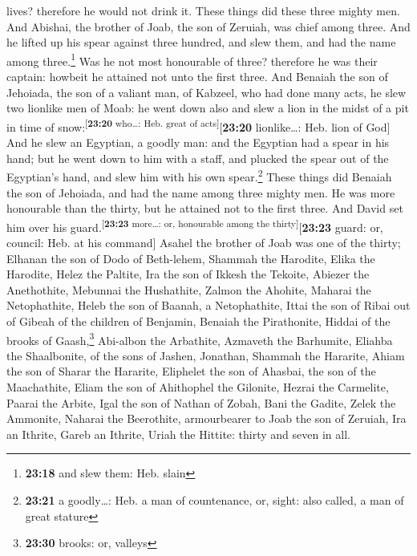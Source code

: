 lives? therefore he would not drink it. These things did these three
mighty men.  And Abishai, the brother of Joab, the son of
Zeruiah, was chief among three. And he lifted up his spear against three
hundred, and slew them, and had the name among three.\footnote{\textbf{23:18}
  and slew them: Heb. slain}  Was he not most honourable
of three? therefore he was their captain: howbeit he attained not unto
the first three.  And Benaiah the son of Jehoiada, the
son of a valiant man, of Kabzeel, who had done many acts, he slew two
lionlike men of Moab: he went down also and slew a lion in the midst of
a pit in time of snow:\textsuperscript{{[}\textbf{23:20} who\ldots: Heb.
great of acts{]}}{[}\textbf{23:20} lionlike\ldots: Heb. lion of God{]}
 And he slew an Egyptian, a goodly man: and the Egyptian
had a spear in his hand; but he went down to him with a staff, and
plucked the spear out of the Egyptian's hand, and slew him with his own
spear.\footnote{\textbf{23:21} a goodly\ldots: Heb. a man of
  countenance, or, sight: also called, a man of great stature}
 These things did Benaiah the son of Jehoiada, and had
the name among three mighty men.  He was more honourable
than the thirty, but he attained not to the first three. And David set
him over his guard.\textsuperscript{{[}\textbf{23:23} more\ldots: or,
honourable among the thirty{]}}{[}\textbf{23:23} guard: or, council:
Heb. at his command{]}  Asahel the brother of Joab was
one of the thirty; Elhanan the son of Dodo of Beth-lehem,
 Shammah the Harodite, Elika the Harodite,
 Helez the Paltite, Ira the son of Ikkesh the Tekoite,
 Abiezer the Anethothite, Mebunnai the Hushathite,
 Zalmon the Ahohite, Maharai the Netophathite,
 Heleb the son of Baanah, a Netophathite, Ittai the son
of Ribai out of Gibeah of the children of Benjamin, 
Benaiah the Pirathonite, Hiddai of the brooks of Gaash,\footnote{\textbf{23:30}
  brooks: or, valleys}  Abi-albon the Arbathite, Azmaveth
the Barhumite,  Eliahba the Shaalbonite, of the sons of
Jashen, Jonathan,  Shammah the Hararite, Ahiam the son of
Sharar the Hararite,  Eliphelet the son of Ahasbai, the
son of the Maachathite, Eliam the son of Ahithophel the Gilonite,
 Hezrai the Carmelite, Paarai the Arbite, 
Igal the son of Nathan of Zobah, Bani the Gadite,  Zelek
the Ammonite, Naharai the Beerothite, armourbearer to Joab the son of
Zeruiah,  Ira an Ithrite, Gareb an Ithrite,
 Uriah the Hittite: thirty and seven in all.

